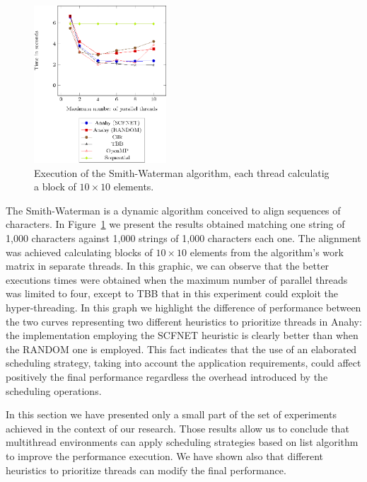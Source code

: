\documentclass[twocolumn]{svjour3}
\begin{document}
\begin{figure}[]
	\centering	
	\includegraphics[width=0.44\textwidth,angle=0]{figs/sw_1000_10.eps}
	\caption{Execution of the Smith-Waterman algorithm, each thread calculatig a block of $10 \times 10$ elements.}
	\label{fig:SW}
\end{figure}

The Smith-Waterman is a dynamic algorithm conceived to align sequences of characters. In Figure~\ref{fig:SW} we present the results obtained matching one string of 1,000 characters against 1,000 strings of 1,000 characters each one. The alignment was achieved calculating blocks of $10 \times 10$ elements from the algorithm's work matrix in separate threads. In this graphic, we can observe that the better executions times were obtained when the maximum number of parallel threads was limited to four, except to TBB that in this experiment could exploit the hyper-threading. In this graph we highlight the difference of performance between the two curves representing two different heuristics to prioritize threads in Anahy: the implementation employing the SCFNET heuristic is clearly better than when the RANDOM one is employed. This fact indicates that the use of an elaborated scheduling strategy, taking into account the application requirements, could affect positively the final performance regardless the overhead introduced by the scheduling operations.





In this section we have presented only a small part of the set of experiments achieved in the context of our research. Those results allow us to conclude that multithread environments can apply scheduling strategies based on list algorithm to improve the performance execution. We have shown also that different heuristics to prioritize threads can modify the final performance.
\end{document}
